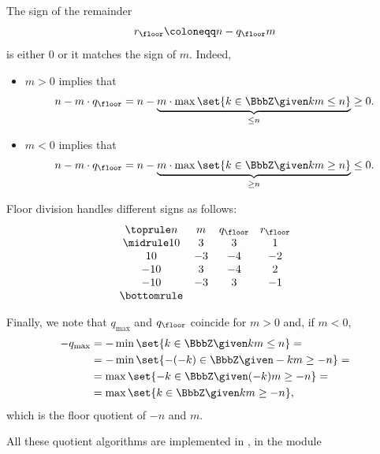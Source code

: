 \begin{remark}
\begin{thmenum}
    The sign of the remainder
    \begin{equation*}
      r_{\floor} \coloneqq n - q_{\floor} m
    \end{equation*}
    is either \( 0 \) or it matches the sign of \( m \). Indeed,
    \begin{itemize}
      \item \( m > 0 \) implies that
      \begin{equation*}
        n - m \cdot q_{\floor}
        =
        n - \underbrace{m \cdot \max\set{ k \in \BbbZ \given km \leq n }}_{\leq n}
        \geq
        0.
      \end{equation*}

      \item \( m < 0 \) implies that
      \begin{equation*}
        n - m \cdot q_{\floor}
        =
        n - \underbrace{m \cdot \max\set{ k \in \BbbZ \given km \geq n }}_{\geq n}
        \leq
        0.
      \end{equation*}
    \end{itemize}

    Floor division handles different signs as follows:
    \begin{equation*}
      \begin{array}{*{4}{c}}
        \toprule
        n   & m  & q_{\floor} & r_{\floor} \\
        \midrule
        10  & 3  & 3          & 1          \\
        10  & -3 & -4         & -2         \\
        -10 & 3  & -4         & 2          \\
        -10 & -3 & 3          & -1         \\
        \bottomrule
      \end{array}
    \end{equation*}

    Finally, we note that \( q_{\max} \) and \( q_{\floor} \) coincide for \( m > 0 \) and, if \( m < 0 \),
    \begin{align*}
      -q_{\max}
      &=
      -\min\set{ k \in \BbbZ \given km \leq n }
      = \\ &=
      -\min\set{ -(-k) \in \BbbZ \given -km \geq -n }
      = \\ &=
      \max\set{ -k \in \BbbZ \given (-k)m \geq -n }
      = \\ &=
      \max\set{ k \in \BbbZ \given km \geq -n },
    \end{align*}
    which is the floor quotient of \( -n \) and \( m \).
  \end{thmenum}
\end{remark}
\begin{comments}
  \item All these quotient algorithms are implemented in \cite{notebook:code}, in the module
  \begin{CodeRefDisplay}
  \end{CodeRefDisplay}
\end{comments}

